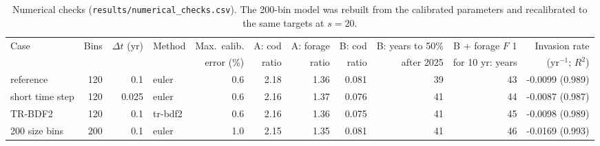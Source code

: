 \documentclass[11pt,letterpaper,fleqn]{article}
\newcommand{\yr}{yr$^{-1}$}
\begin{document}
\begin{table}[p]\caption{Numerical checks (\nolinkurl{results/numerical_checks.csv}). The 200-bin model was rebuilt from the calibrated parameters and recalibrated to the same targets at $s=20$.}\label{tab:S-numerical}
\centering\scriptsize\begin{adjustbox}{max width=\textwidth}\begin{tabular}{@{}lrrlrrrrrrr@{}}\toprule
Case & Bins & $\Delta t$ (yr) & Method & Max.\ calib. & A: cod & A: forage & B: cod & B: years to 50\% & B + forage $F$ 1 & Invasion rate\\
 & & & & error (\%) & ratio & ratio & ratio & after 2025 & for 10 yr: years & (\yr; $R^2$)\\\midrule
reference & 120 & 0.1 & euler & 0.6 & 2.18 & 1.36 & 0.081 & 39 & 43 & -0.0099 (0.989)\\
short time step & 120 & 0.025 & euler & 0.6 & 2.16 & 1.37 & 0.076 & 41 & 44 & -0.0087 (0.987)\\
TR-BDF2 & 120 & 0.1 & tr-bdf2 & 0.6 & 2.16 & 1.36 & 0.075 & 41 & 45 & -0.0098 (0.989)\\
200 size bins & 200 & 0.1 & euler & 1.0 & 2.15 & 1.35 & 0.081 & 41 & 46 & -0.0169 (0.993)\\
\bottomrule\end{tabular}\end{adjustbox}\end{table}
\end{document}
